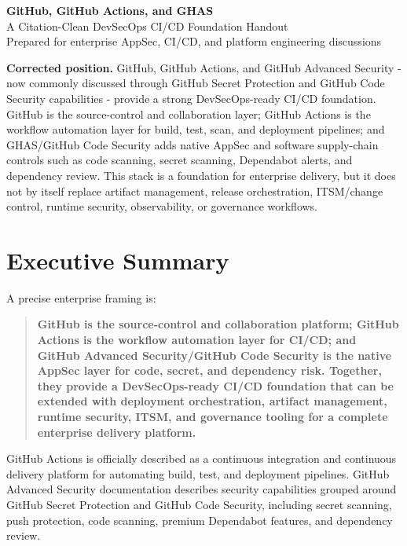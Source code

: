 \documentclass[11pt]{article}
\begin{document}
\begin{center}
  {\LARGE \textbf{GitHub, GitHub Actions, and GHAS}}\\[0.25em]
  {\large A Citation-Clean DevSecOps CI/CD Foundation Handout}\\[0.5em]
  {\small Prepared for enterprise AppSec, CI/CD, and platform engineering discussions}
\end{center}

\vspace{0.5em}

\begin{positionbox}
\textbf{Corrected position.} GitHub, GitHub Actions, and GitHub Advanced Security - now commonly discussed through GitHub Secret Protection and GitHub Code Security capabilities - provide a strong DevSecOps-ready CI/CD foundation. GitHub is the source-control and collaboration layer; GitHub Actions is the workflow automation layer for build, test, scan, and deployment pipelines; and GHAS/GitHub Code Security adds native AppSec and software supply-chain controls such as code scanning, secret scanning, Dependabot alerts, and dependency review. This stack is a foundation for enterprise delivery, but it does not by itself replace artifact management, release orchestration, ITSM/change control, runtime security, observability, or governance workflows.\cite{github-actions-understanding,github-ghas-about}
\end{positionbox}

\section{Executive Summary}

A precise enterprise framing is:

\begin{quote}
\textbf{GitHub is the source-control and collaboration platform; GitHub Actions is the workflow automation layer for CI/CD; and GitHub Advanced Security/GitHub Code Security is the native AppSec layer for code, secret, and dependency risk. Together, they provide a DevSecOps-ready CI/CD foundation that can be extended with deployment orchestration, artifact management, runtime security, ITSM, and governance tooling for a complete enterprise delivery platform.}
\end{quote}

GitHub Actions is officially described as a continuous integration and continuous delivery platform for automating build, test, and deployment pipelines.\cite{github-actions-understanding,github-actions-quickstart} GitHub Advanced Security documentation describes security capabilities grouped around GitHub Secret Protection and GitHub Code Security, including secret scanning, push protection, code scanning, premium Dependabot features, and dependency review.\cite{github-ghas-about}
\end{document}

